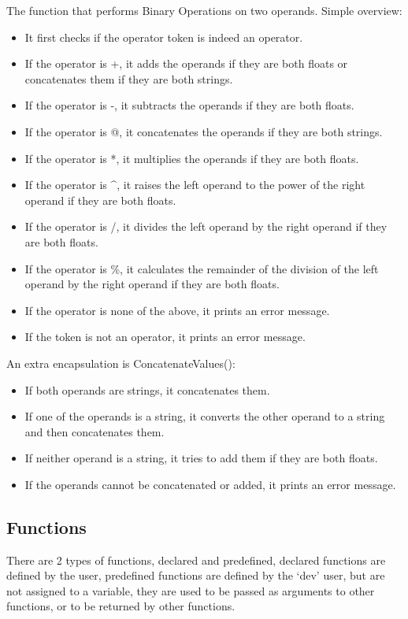 The function that performs Binary Operations on two operands. Simple overview:
\begin{itemize}
    \item It first checks if the operator token is indeed an operator.
    \item If the operator is +, it adds the operands if they are both floats or concatenates them if they are both strings.
    \item If the operator is -, it subtracts the operands if they are both floats.
    \item If the operator is @, it concatenates the operands if they are both strings.
    \item If the operator is *, it multiplies the operands if they are both floats.
    \item If the operator is \^{}, it raises the left operand to the power of the right operand if they are both floats.
    \item If the operator is /, it divides the left operand by the right operand if they are both floats.
    \item If the operator is \%, it calculates the remainder of the division of the left operand by the right operand if they are both floats.
    \item If the operator is none of the above, it prints an error message.
    \item If the token is not an operator, it prints an error message.
\end{itemize}
An extra encapsulation is ConcatenateValues{()}:
\begin{itemize}
    \item If both operands are strings, it concatenates them.
    \item If one of the operands is a string, it converts the other operand to a string and then concatenates them.
    \item If neither operand is a string, it tries to add them if they are both floats.
    \item If the operands cannot be concatenated or added, it prints an error message.
\end{itemize}

\newpage

\subsection{Functions}
There are 2 types of functions, declared and predefined, declared functions are defined by the user, predefined functions are defined by the `dev' user, but are not assigned to a variable, they are used to be passed as arguments to other functions, or to be returned by other functions. 

